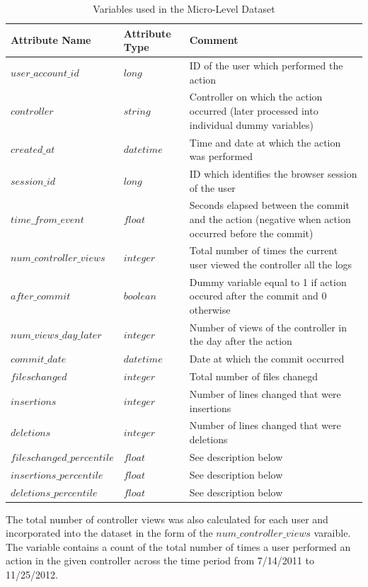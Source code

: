 \documentclass[12pt]{article}
\begin{document}
\begin{table}
\centering
\caption{Variables used in the Micro-Level Dataset}
\begin{tabular}{l | l | l}
Attribute Name & Attribute Type & Comment \\
\hline \hline
$user\_account\_id$ & $long$ & ID of the user which performed the action \\
$controller$ & $string$ & Controller on which the action occurred (later processed into individual dummy variables) \\
$created\_at$ & $datetime$ & Time and date at which the action was performed \\
$session\_id$ & $long$ & ID which identifies the browser session of the user \\
$time\_from\_event$ & $float$ & Seconds elapsed between the commit and the action (negative when action occurred before the commit) \\
$num\_controller\_views$ & $integer$ & Total number of times the current user viewed the controller all the logs \\
$after\_commit$ & $boolean$ & Dummy variable equal to 1 if action occured after the commit and 0 otherwise \\
$num\_views\_day\_later$ & $integer$ & Number of views of the controller in the day after the action \\
$commit\_date$ & $datetime$ & Date at which the commit occurred \\
$fileschanged$ & $integer$ & Total number of files chanegd \\
$insertions$ & $integer$ & Number of lines changed that were insertions \\
$deletions$ & $integer$ & Number of lines changed that were deletions \\
$fileschanged\_percentile$ & $float$ & See description below \\
$insertions\_percentile$ & $float$ & See description below \\
$deletions\_percentile$ & $float$ & See description below \\
\end{tabular}
\end{table}

The total number of controller views was also calculated for each user and incorporated into the dataset in the form of the $num\_controller\_views$ varaible. The variable contains a count of the total number of times a user performed an action in the given controller across the time period from 7/14/2011 to 11/25/2012. 
\end{document}
